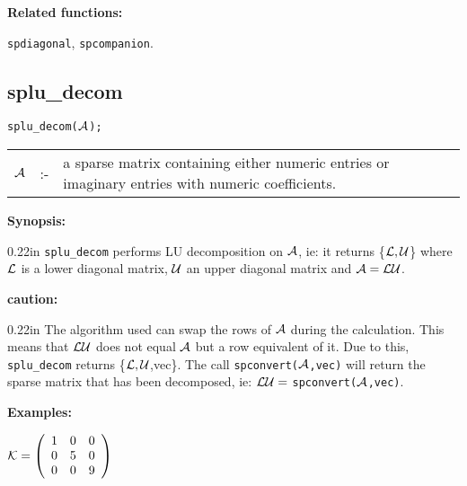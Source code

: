 {\bf Related functions:}

\hspace*{0.175in} {\tt spdiagonal}, {\tt spcompanion}.


\subsection{splu\_decom}


\hspace*{0.175in} {\tt splu\_decom(${\cal A}$);}

\hspace*{0.1in} 
\begin{tabular}{l l l}
${\cal A}$ &:-& \parbox[t]{.848\linewidth}{a sparse matrix containing either 
numeric entries or imaginary entries with numeric coefficients.}
\end{tabular}

{\bf Synopsis:} %

\begin{addtolength}{\leftskip}{0.22in}
              {\tt splu\_decom} performs LU decomposition on ${\cal A}$,
              ie: it returns \{${\cal L,U}$\} where ${\cal L}$
              is a lower diagonal matrix, ${\cal U}$ an upper diagonal
              matrix and ${\cal A} = {\cal LU}$.

\end{addtolength}

{\bf caution:}

\begin{addtolength}{\leftskip}{0.22in}
The algorithm used can swap the rows of ${\cal A}$ 
                during the calculation. This means that ${\cal LU}$ does
                not equal ${\cal A}$ but a row equivalent of it. Due to
                this, {\tt splu\_decom} returns \{${\cal L,U}$,vec\}. The
                call {\tt spconvert(${\cal A}$,vec)} will return the 
                sparse matrix that has been decomposed, ie: ${\cal LU} = $
                {\tt spconvert(${\cal A}$,vec)}.

\end{addtolength}

{\bf Examples:}

\begin{flushleft}
\hspace*{0.175in}
\begin{math}  
{\cal K} = \left( \begin{array}{ccc} 1 & 0 & 0 \\ 0 & 5 & 0 \\ 0 & 0 & 9
\end{array} \right)
\end{math}  
\end{flushleft}

